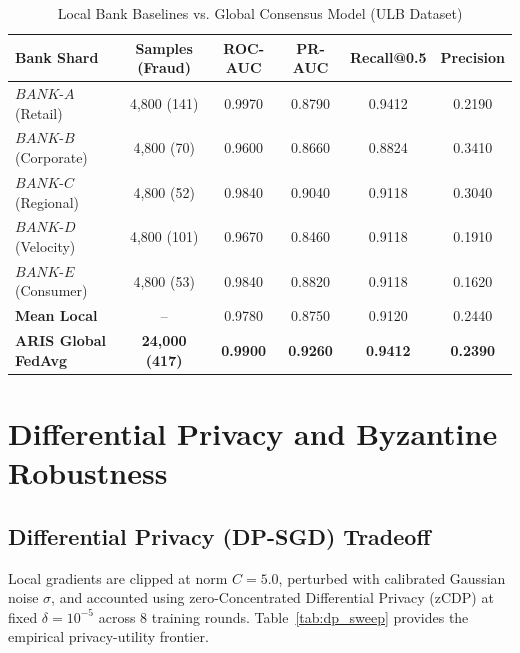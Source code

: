 \documentclass[conference]{IEEEtran}
\begin{document}
\begin{table}[htbp]
\centering
\caption{Local Bank Baselines vs. Global Consensus Model (ULB Dataset)}
\label{tab:bank_shards_breakdown}
\small
\begin{tabular}{lccccc}
\toprule
\textbf{Bank Shard} & \textbf{Samples (Fraud)} & \textbf{ROC-AUC} & \textbf{PR-AUC} & \textbf{Recall@0.5} & \textbf{Precision} \\
\midrule
$BANK\text{-}A$ (Retail)      & 4,800 (141) & 0.9970 & 0.8790 & 0.9412 & 0.2190 \\
$BANK\text{-}B$ (Corporate)   & 4,800 (70)  & 0.9600 & 0.8660 & 0.8824 & 0.3410 \\
$BANK\text{-}C$ (Regional)    & 4,800 (52)  & 0.9840 & 0.9040 & 0.9118 & 0.3040 \\
$BANK\text{-}D$ (Velocity)    & 4,800 (101) & 0.9670 & 0.8460 & 0.9118 & 0.1910 \\
$BANK\text{-}E$ (Consumer)    & 4,800 (53)  & 0.9840 & 0.8820 & 0.9118 & 0.1620 \\
\midrule
\textbf{Mean Local}           & --          & 0.9780 & 0.8750 & 0.9120 & 0.2440 \\
\textbf{ARIS Global FedAvg}   & \textbf{24,000 (417)} & \textbf{0.9900} & \textbf{0.9260} & \textbf{0.9412} & \textbf{0.2390} \\
\bottomrule
\end{tabular}
\end{table}

\section{Differential Privacy and Byzantine Robustness}
\label{sec:privacy_byzantine}

\subsection{Differential Privacy (DP-SGD) Tradeoff}
Local gradients are clipped at norm $C = 5.0$, perturbed with calibrated Gaussian noise $\sigma$, and accounted using zero-Concentrated Differential Privacy (zCDP) at fixed $\delta = 10^{-5}$ across 8 training rounds. Table~\ref{tab:dp_sweep} provides the empirical privacy-utility frontier.
\end{document}
